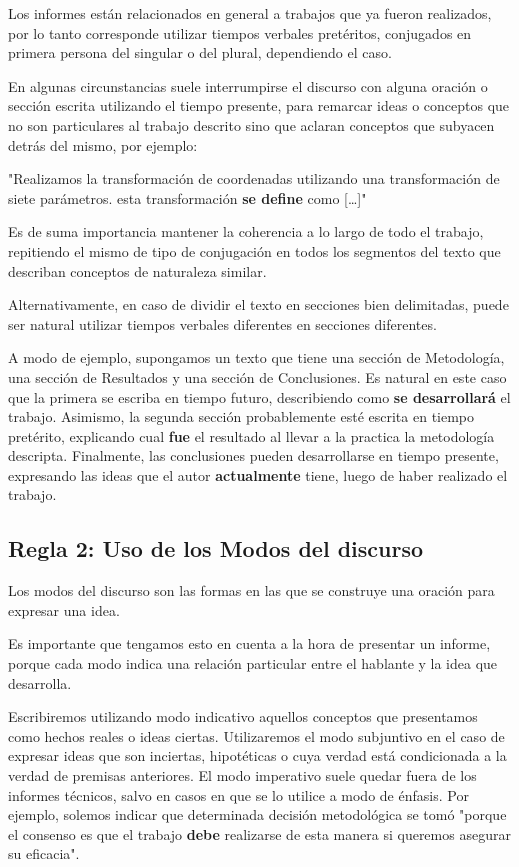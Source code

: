 \documentclass[11pt]{article}
\begin{document}
Los informes están relacionados en general a trabajos que ya fueron realizados, por lo 
tanto corresponde utilizar tiempos verbales pretéritos, conjugados en primera persona
del singular o del plural, dependiendo el caso.

En algunas circunstancias suele interrumpirse el discurso con alguna oración o sección
escrita utilizando el tiempo presente, para remarcar ideas o conceptos que no son particulares
al trabajo descrito sino que aclaran conceptos que subyacen detrás del mismo, por ejemplo:

"Realizamos la transformación de coordenadas utilizando una transformación de siete parámetros. 
esta transformación \textbf{se define} como [\ldots{}]"

Es de suma importancia mantener la coherencia a lo largo de todo el trabajo, repitiendo
el mismo de tipo de conjugación en todos los segmentos del texto que describan conceptos
de naturaleza similar.

Alternativamente, en caso de dividir el texto en secciones bien delimitadas, puede ser natural
utilizar tiempos verbales diferentes en secciones diferentes. 

A modo de ejemplo, supongamos un texto que tiene una sección de Metodología, una sección de 
Resultados y una sección de Conclusiones. Es natural en este caso que la primera se escriba 
en tiempo futuro, describiendo como \textbf{se desarrollará} el trabajo. Asimismo, la segunda sección
probablemente esté escrita en tiempo pretérito, explicando cual \textbf{fue} el resultado al llevar
a la practica la metodología descripta. Finalmente, las conclusiones pueden desarrollarse en 
tiempo presente, expresando las ideas que el autor \textbf{actualmente} tiene, luego de haber realizado
el trabajo.

\subsection{Regla 2: Uso de los Modos del discurso}
\label{sec-2-2}

Los modos del discurso son las formas en las que se construye una oración para expresar una idea.

Es importante que tengamos esto en cuenta a la hora de presentar un informe, porque cada modo
indica una relación particular entre el hablante y la idea que desarrolla.

Escribiremos utilizando modo indicativo aquellos conceptos que presentamos como hechos reales o
ideas ciertas.
Utilizaremos el modo subjuntivo en el caso de expresar ideas que son inciertas, hipotéticas o 
cuya verdad está condicionada a la verdad de premisas anteriores.
El modo imperativo suele quedar fuera de los informes técnicos, salvo en casos en que se lo utilice
a modo de énfasis. Por ejemplo, solemos indicar que determinada decisión metodológica se tomó "porque
el consenso es que el trabajo \textbf{debe} realizarse de esta manera si queremos asegurar su eficacia".
\end{document}
